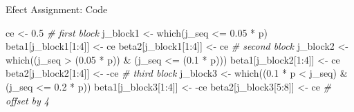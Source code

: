 \documentclass{beamer}
\newenvironment{Shaded}{\begin{snugshade}}{\end{snugshade}}
\newcommand{\DecValTok}[1]{\textcolor[rgb]{0.00,0.00,0.81}{{#1}}}
\newcommand{\FloatTok}[1]{\textcolor[rgb]{0.00,0.00,0.81}{{#1}}}
\newcommand{\SpecialCharTok}[1]{\textcolor[rgb]{0.00,0.00,0.00}{{#1}}}
\newcommand{\CommentTok}[1]{\textcolor[rgb]{0.56,0.35,0.01}{\textit{{#1}}}}
\newcommand{\OtherTok}[1]{\textcolor[rgb]{0.56,0.35,0.01}{{#1}}}
\newcommand{\FunctionTok}[1]{\textcolor[rgb]{0.00,0.00,0.00}{{#1}}}
\newcommand{\NormalTok}[1]{{#1}}
\begin{document}
\begin{frame}[fragile]{Efect Assignment: Code}
\protect\hypertarget{efect-assignment-code}{}
\begin{Shaded}
\begin{Highlighting}[]
\NormalTok{  ce }\OtherTok{\textless{}{-}} \FloatTok{0.5}
  \CommentTok{\# first block}
\NormalTok{  j\_block1 }\OtherTok{\textless{}{-}} \FunctionTok{which}\NormalTok{(j\_seq }\SpecialCharTok{\textless{}=} \FloatTok{0.05} \SpecialCharTok{*}\NormalTok{ p)}
\NormalTok{  beta1[j\_block1[}\DecValTok{1}\SpecialCharTok{:}\DecValTok{4}\NormalTok{]] }\OtherTok{\textless{}{-}}\NormalTok{ ce}
\NormalTok{  beta2[j\_block1[}\DecValTok{1}\SpecialCharTok{:}\DecValTok{4}\NormalTok{]] }\OtherTok{\textless{}{-}}\NormalTok{ ce}
  \CommentTok{\# second block}
\NormalTok{  j\_block2 }\OtherTok{\textless{}{-}} \FunctionTok{which}\NormalTok{((j\_seq }\SpecialCharTok{\textgreater{}}\NormalTok{ (}\FloatTok{0.05} \SpecialCharTok{*}\NormalTok{ p)) }\SpecialCharTok{\&}\NormalTok{ (j\_seq }\SpecialCharTok{\textless{}=}\NormalTok{ (}\FloatTok{0.1} \SpecialCharTok{*}\NormalTok{ p)))}
\NormalTok{  beta1[j\_block2[}\DecValTok{1}\SpecialCharTok{:}\DecValTok{4}\NormalTok{]] }\OtherTok{\textless{}{-}}\NormalTok{ ce}
\NormalTok{  beta2[j\_block2[}\DecValTok{1}\SpecialCharTok{:}\DecValTok{4}\NormalTok{]] }\OtherTok{\textless{}{-}} \SpecialCharTok{{-}}\NormalTok{ce}
  \CommentTok{\# third block}
\NormalTok{  j\_block3 }\OtherTok{\textless{}{-}} \FunctionTok{which}\NormalTok{((}\FloatTok{0.1} \SpecialCharTok{*}\NormalTok{ p }\SpecialCharTok{\textless{}}\NormalTok{ j\_seq) }\SpecialCharTok{\&}\NormalTok{ (j\_seq }\SpecialCharTok{\textless{}=} \FloatTok{0.2} \SpecialCharTok{*}\NormalTok{ p))}
\NormalTok{  beta1[j\_block3[}\DecValTok{1}\SpecialCharTok{:}\DecValTok{4}\NormalTok{]] }\OtherTok{\textless{}{-}} \SpecialCharTok{{-}}\NormalTok{ce}
\NormalTok{  beta2[j\_block3[}\DecValTok{5}\SpecialCharTok{:}\DecValTok{8}\NormalTok{]] }\OtherTok{\textless{}{-}}\NormalTok{ ce }\CommentTok{\# offset by 4}
\end{Highlighting}
\end{Shaded}
\end{frame}
\end{document}
